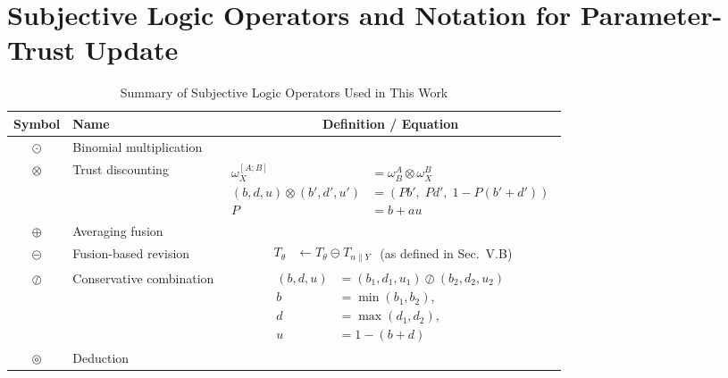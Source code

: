\section{Subjective Logic Operators and Notation for Parameter-Trust Update}\label{app:operator}
\begin{table}[H]
\centering
\caption{Summary of Subjective Logic Operators Used in This Work}
\label{tab:operators}
\renewcommand{\arraystretch}{1.3}
\begin{tabular}{|c|l|c|}
\hline
\textbf{Symbol} & \textbf{Name} & \textbf{Definition / Equation} \\ \hline

$\odot$ & Binomial multiplication &
\cite{josang2016subjective} \\ \hline

$\otimes$ & Trust discounting &
$\begin{aligned}
\omega^{[A;B]}_{X} &= \omega^A_B \otimes \omega^B_X \\
(b,d,u) \otimes (b',d',u') &= \left(Pb',\; Pd',\; 1-P\left(b'+d'\right)\right)\\
P &= b+au 
\end{aligned}$ \\ \hline

$\oplus$ & Averaging fusion &
\cite{8009820}\\ \hline

$\circleddash$ & Fusion-based revision &
$\begin{aligned}
T_{\theta} &\leftarrow T_{\theta} \circleddash T_{n \parallel Y}
\end{aligned}$ 
(as defined in Sec.~V.B) \\ \hline

$\oslash$ & Conservative combination &
$\begin{aligned}
(b,d,u) &= (b_1,d_1,u_1) \oslash (b_2,d_2,u_2) \\
b &= \min(b_1,b_2), \\
d &= \max(d_1,d_2), \\
u &= 1-(b+d)
\end{aligned}$ \\ \hline

$\circledcirc $ & Deduction &
\cite{7528033,josang2016subjective}  \\ \hline

\end{tabular}
\end{table}
